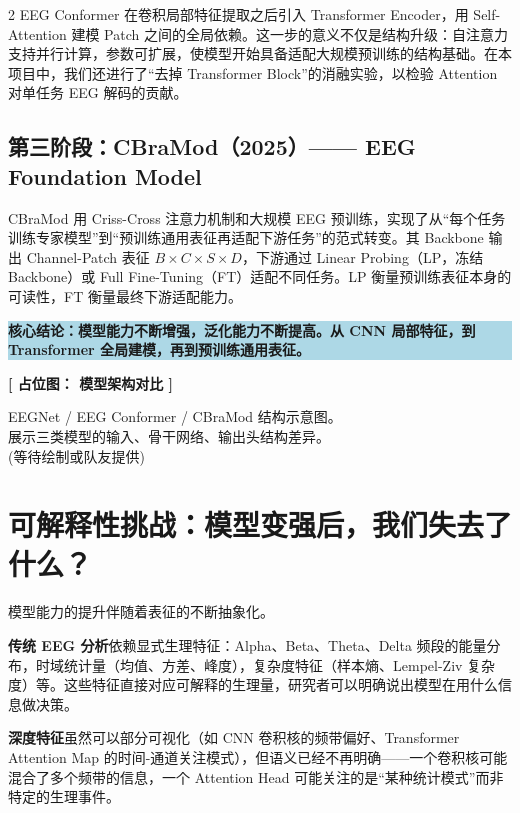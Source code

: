 \documentclass[12pt, a0paper]{article}
\renewcommand{\Large}{\fontsize{34}{42}\selectfont}
\renewcommand{\small}{\fontsize{18}{24}\selectfont}
\newcommand{\placeholder}[2]{%
    \begin{center}
    \colorbox{mygray!12}{\parbox{0.9\columnwidth}{%
        \centering
        \vspace{1.5em}
        {\Large\bfseries\color{mygray} [ 占位图： #1 ]}
        \vspace{1em}

        {\small\color{mygray} #2}
        \vspace{1.5em}
    }}
    \end{center}
}
\newcommand{\highlight}[1]{%
    \colorbox{lightblue}{\parbox{\columnwidth}{\centering\bfseries #1}}
}
\begin{document}
\begin{multicols}{2}
EEG Conformer 在卷积局部特征提取之后引入 Transformer Encoder，用 Self-Attention 建模 Patch 之间的全局依赖。这一步的意义不仅是结构升级：自注意力支持并行计算，参数可扩展，使模型开始具备适配大规模预训练的结构基础。在本项目中，我们还进行了“去掉 Transformer Block”的消融实验，以检验 Attention 对单任务 EEG 解码的贡献。

\subsection{第三阶段：CBraMod（2025）—— EEG Foundation Model}

CBraMod 用 Criss-Cross 注意力机制和大规模 EEG 预训练，实现了从“每个任务训练专家模型”到“预训练通用表征再适配下游任务”的范式转变。其 Backbone 输出 Channel-Patch 表征 $B \times C \times S \times D$，下游通过 Linear Probing（LP，冻结 Backbone）或 Full Fine-Tuning（FT）适配不同任务。LP 衡量预训练表征本身的可读性，FT 衡量最终下游适配能力。

\vspace{2em}
\highlight{核心结论：模型能力不断增强，泛化能力不断提高。从 CNN 局部特征，到 Transformer 全局建模，再到预训练通用表征。}

\vspace{2em}

\placeholder{模型架构对比}{%
    EEGNet / EEG Conformer / CBraMod 结构示意图。\\
    展示三类模型的输入、骨干网络、输出头结构差异。\\
    \small (等待绘制或队友提供)}

\section{可解释性挑战：模型变强后，我们失去了什么？}

模型能力的提升伴随着表征的不断抽象化。

\textbf{传统 EEG 分析}依赖显式生理特征：Alpha、Beta、Theta、Delta 频段的能量分布，时域统计量（均值、方差、峰度），复杂度特征（样本熵、Lempel-Ziv 复杂度）等。这些特征直接对应可解释的生理量，研究者可以明确说出模型在用什么信息做决策。

\textbf{深度特征}虽然可以部分可视化（如 CNN 卷积核的频带偏好、Transformer Attention Map 的时间-通道关注模式），但语义已经不再明确——一个卷积核可能混合了多个频带的信息，一个 Attention Head 可能关注的是“某种统计模式”而非特定的生理事件。


\end{multicols}
\end{document}

